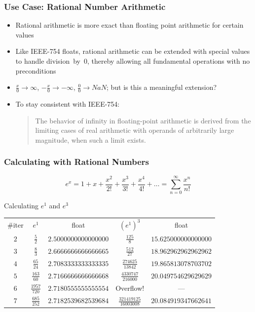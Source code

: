 \documentclass[aspectratio=169]{beamer}
\newif\iftransitions
\begin{document}
\begin{frame}
  \frametitle{Use Case: Rational Number Arithmetic}
  
  \begin{itemize}
    \item Rational arithmetic is more exact than floating point arithmetic for certain values
    \item Like IEEE-754 floats, rational arithmetic can be extended with special values to handle division~by~$0$, thereby allowing all fundamental operations with no preconditions
    \item $\frac{x}{0} \rightarrow \infty$, $-\frac{x}{0} \rightarrow -\infty$, $\frac{0}{0} \rightarrow NaN$; but is this a meaningful extension?
    \item To stay consistent with IEEE-754:
        \begin{quotation}
        The behavior of infinity in floating-point arithmetic is derived from the limiting cases of real arithmetic with
operands of arbitrarily large magnitude, when such a limit exists. 
        \end{quotation}
  \end{itemize}
\end{frame}

\begin{frame}
  \frametitle{Calculating with Rational Numbers}
  
  \begin{equation*}
  e^x = 1+ x + \frac{x^2}{2!} + \frac{x^3}{3!} + \frac{x^4}{4!} + \ldots = \sum_{n = 0}^{\infty}{\frac{x^{n}}{n!}}
  \end{equation*}
  \iftransitions \pause \fi 
  
  Calculating $e^1$ and $e^3$
  \begin{tabular}{c c c c c}
  \#iter & $e^1$ & float & $(e^1)^3$ & float   \\
  $2$ & $\frac{5   }{2   }$ & $2.5000000000000000$ &  $\frac{125}{8}$              & $15.625000000000000$ \\[5pt]
  $3$ & $\frac{8   }{3   }$ & $2.6666666666666665$ &  $\frac{512}{27}$             & $18.962962962962962$ \\[5pt]
  $4$ & $\frac{65  }{24  }$ & $2.7083333333333335$ &  $\frac{274625}{13842}$       & $19.865813078703702$ \\[5pt]
  $5$ & $\frac{163 }{60  }$ & $2.7166666666666668$ &  $\frac{4330747}{216000}$     & $20.049754629629629$ \\[5pt]
  $6$ & $\frac{1957}{720 }$ & $2.7180555555555554$ &  Overflow!                    & ---                  \\[5pt]
  $7$ & $\frac{685 }{252 }$ & $2.7182539682539684$ &  $\frac{321419125}{16003008}$ & $20.084919347662641$ \\[5pt]
  \end{tabular}
\end{frame}
\end{document}
